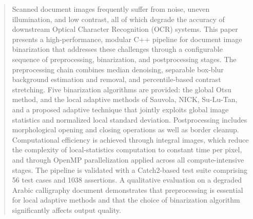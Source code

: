 \begin{abstract}
Scanned document images frequently suffer from noise, uneven illumination, and low contrast, all of which degrade the accuracy of downstream Optical Character Recognition (OCR) systems. This paper presents a high-performance, modular C++ pipeline for document image binarization that addresses these challenges through a configurable sequence of preprocessing, binarization, and postprocessing stages. The preprocessing chain combines median denoising, separable box-blur background estimation and removal, and percentile-based contrast stretching. Five binarization algorithms are provided: the global Otsu method, and the local adaptive methods of Sauvola, NICK, Su-Lu-Tan, and a proposed adaptive technique that jointly exploits global image statistics and normalized local standard deviation. Postprocessing includes morphological opening and closing operations as well as border cleanup. Computational efficiency is achieved through integral images, which reduce the complexity of local-statistics computation to constant time per pixel, and through OpenMP parallelization applied across all compute-intensive stages. The pipeline is validated with a Catch2-based test suite comprising 56 test cases and 1038 assertions. A qualitative evaluation on a degraded Arabic calligraphy document demonstrates that preprocessing is essential for local adaptive methods and that the choice of binarization algorithm significantly affects output quality.
\end{abstract}
